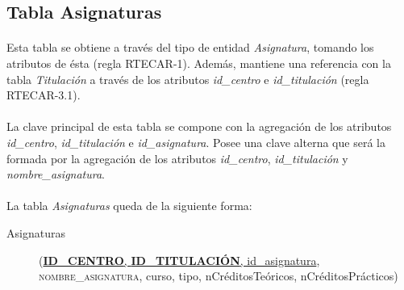    \subsection{Tabla Asignaturas}

      \paragraph{}Esta tabla se obtiene a través del tipo de entidad
      \textit{Asignatura}, tomando los atributos de ésta (regla RTECAR-1).
      Además, mantiene una referencia con la tabla \textit{Titulación} a través
      de los atributos \textit{id\_centro} e \textit{id\_titulación} (regla
      RTECAR-3.1).

      \paragraph{}La clave principal de esta tabla se compone con la agregación
      de los atributos \textit{id\_centro}, \textit{id\_titulación} e
      \textit{id\_asignatura}. Posee una clave alterna que será la formada por
      la agregación de los atributos \textit{id\_centro},
      \textit{id\_titulación} y \textit{nombre\_asignatura}.

      \paragraph{}La tabla \textit{Asignaturas} queda de la siguiente forma:

      \begin{description}
         \item[Asignaturas] \begin{flushleft}(\underline{\textbf{ID\_CENTRO},
         \textbf{ID\_TITULACIÓN}, id\_asignatura},
         \textsc{nombre\_asignatura}, curso, tipo, nCréditosTeóricos,
         nCréditosPrácticos)\end{flushleft}
      \end{description}
